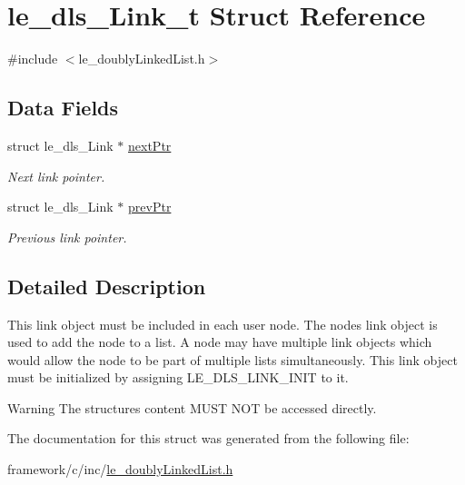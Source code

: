 \hypertarget{structle__dls___link__t}{}\section{le\+\_\+dls\+\_\+\+Link\+\_\+t Struct Reference}
\label{structle__dls___link__t}


{\ttfamily \#include $<$le\+\_\+doubly\+Linked\+List.\+h$>$}

\subsection*{Data Fields}
\begin{DoxyCompactItemize}
\item 
\hypertarget{structle__dls___link__t_aeb5c99f0b4fb15daefef9b81f04b98dc}{}struct le\+\_\+dls\+\_\+\+Link $\ast$ \hyperlink{structle__dls___link__t_aeb5c99f0b4fb15daefef9b81f04b98dc}{next\+Ptr}\label{structle__dls___link__t_aeb5c99f0b4fb15daefef9b81f04b98dc}

\begin{DoxyCompactList}\small\item\em Next link pointer. \end{DoxyCompactList}\item 
\hypertarget{structle__dls___link__t_acf978c7d31cf7ab2aa0f7b36603f4a12}{}struct le\+\_\+dls\+\_\+\+Link $\ast$ \hyperlink{structle__dls___link__t_acf978c7d31cf7ab2aa0f7b36603f4a12}{prev\+Ptr}\label{structle__dls___link__t_acf978c7d31cf7ab2aa0f7b36603f4a12}

\begin{DoxyCompactList}\small\item\em Previous link pointer. \end{DoxyCompactList}\end{DoxyCompactItemize}


\subsection{Detailed Description}
This link object must be included in each user node. The node\textquotesingle{}s link object is used to add the node to a list. A node may have multiple link objects which would allow the node to be part of multiple lists simultaneously. This link object must be initialized by assigning L\+E\+\_\+\+D\+L\+S\+\_\+\+L\+I\+N\+K\+\_\+\+I\+N\+I\+T to it.

\begin{DoxyWarning}{Warning}
The structure\textquotesingle{}s content M\+U\+S\+T N\+O\+T be accessed directly. 
\end{DoxyWarning}


The documentation for this struct was generated from the following file\+:\begin{DoxyCompactItemize}
\item 
framework/c/inc/\hyperlink{le__doubly_linked_list_8h}{le\+\_\+doubly\+Linked\+List.\+h}\end{DoxyCompactItemize}

